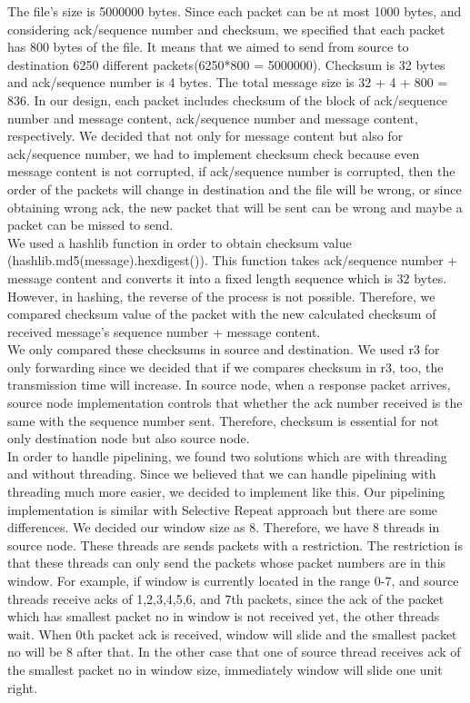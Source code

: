 \documentclass[conference]{IEEEtran}
\begin{document}
The file's size is 5000000 bytes. Since each packet can be at most 1000 bytes, and considering ack/sequence number and checksum, we specified that each packet has 800 bytes of the file. It means that we aimed to send from source to destination 6250 different packets(6250*800 = 5000000). Checksum is 32 bytes and ack/sequence number is 4 bytes. The total message size is 32 + 4 + 800 = 836. In our design, each packet includes checksum of the block of ack/sequence number and message content, ack/sequence number and message content, respectively. We decided that not only for message content but also for ack/sequence number, we had to implement checksum check because even message content is not corrupted, if ack/sequence number is corrupted, then the order of the packets will change in destination and the file will be wrong, or since obtaining wrong ack, the new packet that will be sent can be wrong and maybe a packet can be missed to send. \\

We used a hashlib function in order to obtain checksum value (hashlib.md5(message).hexdigest()). This function takes ack/sequence number + message content and converts it into a fixed length sequence which is 32 bytes. However, in hashing, the reverse of the process is not possible. Therefore, we compared checksum value of the packet with the new calculated checksum of received message's sequence number + message content. \\

We only compared these checksums in source and destination. We used r3 for only forwarding since we decided that if we compares checksum in r3, too, the transmission time will increase. In source node, when a response packet arrives, source node implementation controls that whether the ack number received is the same with the sequence number sent. Therefore, checksum is essential for not only destination node but also source node. \\

In order to handle pipelining, we found two solutions which are with threading and without threading. Since we believed that we can handle pipelining with threading much more easier, we decided to implement like this. Our pipelining implementation is similar with Selective Repeat approach but there are some differences. We decided our window size as 8. Therefore, we have 8 threads in source node. These threads are sends packets with a restriction. The restriction is that these threads can only send the packets whose packet numbers are in this window. For example, if window is currently located in the range 0-7, and source threads receive acks of 1,2,3,4,5,6, and 7th packets, since the ack of the packet which has smallest packet no in window is not received yet, the other threads wait. When 0th packet ack is received, window will slide and the smallest packet no will be 8 after that. In the other case that one of source thread receives ack of the smallest packet no in window size, immediately window will slide one unit right. \\
\end{document}
